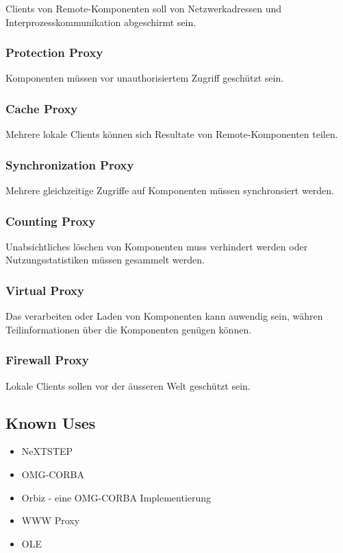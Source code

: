 Clients von Remote-Komponenten soll von Netzwerkadressen und Interprozesskommunikation abgeschirmt sein.

\subsubsection*{Protection Proxy}


Komponenten müssen vor unauthorisiertem Zugriff geschützt sein.

\subsubsection*{Cache Proxy}


Mehrere lokale Clients können sich Resultate von Remote-Komponenten teilen.

\subsubsection*{ Synchronization Proxy}


Mehrere gleichzeitige Zugriffe auf Komponenten müssen synchronsiert werden.

\subsubsection*{Counting Proxy}


Unabsichtliches löschen von Komponenten muss verhindert werden oder Nutzungsstatistiken müssen gesammelt werden.

\subsubsection*{Virtual Proxy}


Das verarbeiten oder Laden von Komponenten kann auwendig sein, währen Teilinformationen über die Komponenten genügen können.

\subsubsection*{Firewall Proxy}


Lokale Clients sollen vor der äusseren Welt geschützt sein.

\subsection*{Known Uses}


\begin{itemize}
	\item NeXTSTEP
	\item OMG-CORBA
	\item Orbiz - eine OMG-CORBA Implementierung
	\item WWW Proxy
	\item OLE
\end{itemize}

